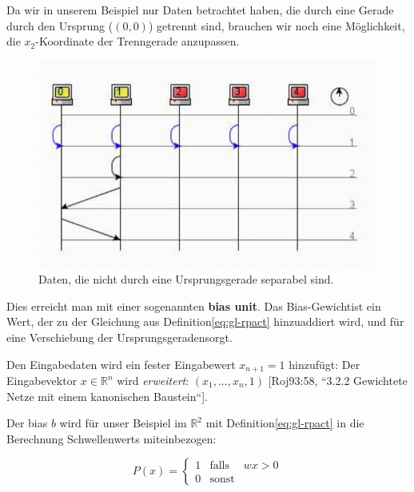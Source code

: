 Da wir in unserem Beispiel nur Daten betrachtet haben, die durch eine Gerade durch den Ursprung ($(0,0)$) getrennt sind, brauchen wir noch eine Möglichkeit, die $x_2$-Koordinate der Trenngerade anzupassen.


\begin{figure}[h]
    \centering
    \includegraphics{images/p1ReadSeq.pdf}
    \caption{Daten, die nicht durch eine Ursprungsgerade separabel sind.}
    \label{fig-nichtseparierbar}
\end{figure}

\noindent
Dies erreicht man mit einer sogenannten \textbf{bias unit}. 
Das Bias-Gewicht\footnotemark[28] ist ein Wert, der zu der Gleichung aus Definition\ref{eq:gl-rpact} hinzuaddiert wird, und für eine Verschiebung der Ursprungsgeraden\footnotemark[29] sorgt.


Den Eingabedaten wird ein fester Eingabewert $x_{n+1} = 1$ hinzufügt: Der Eingabevektor $x \in  \mathbb{R}^n$ wird \textit{erweitert}: $(x_1, ..., x_n, 1)$ [Roj93:58, ``3.2.2 Gewichtete Netze mit einem kanonischen Baustein``].

\noindent
Der bias $b$ wird für unser Beispiel im $ \mathbb{R}^2$ mit Definition\ref{eq:gl-rpact} in die Berechnung Schwellenwerts miteinbezogen:

\begin{equation}
P(x) = \begin{cases}
            1 &\text{falls} &wx > 0 \\
            0 &\text{sonst}
\end{cases}
\end{equation}

